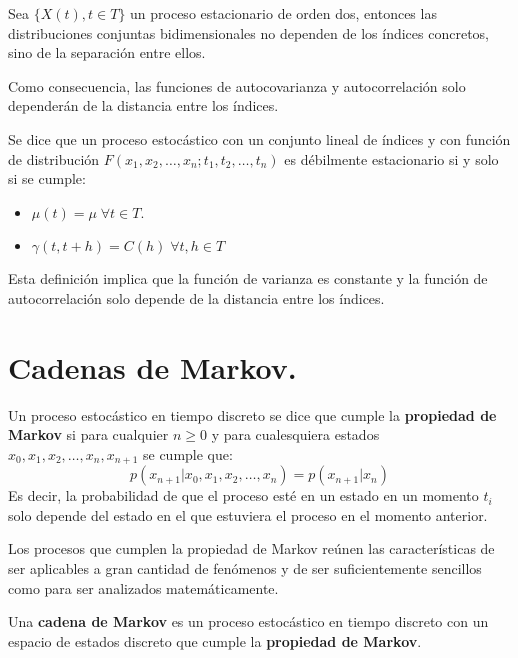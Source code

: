 \begin{teorema}
Sea $\{X(t), t\in T\}$ un proceso estacionario de orden dos, entonces las distribuciones conjuntas bidimensionales no dependen de los \'indices concretos, sino de la separaci\'on entre ellos.
\end{teorema}

Como consecuencia, las funciones de autocovarianza y autocorrelaci\'on solo depender\'an de la distancia entre los \'indices.

\begin{definicion}
Se dice que un proceso estoc\'astico con un conjunto lineal de \'indices y con funci\'on de distribuci\'on $F(x_1,x_2,\ldots,x_n;t_1,t_2,\ldots,t_n)$ es d\'ebilmente estacionario si y solo si se cumple:
\begin{itemize}
\item $\mu(t)=\mu\;\forall t\in T$.
\item $\gamma(t,t+h)=C(h)\;\forall t,h\in T$
\end{itemize}
\end{definicion}

Esta definici\'on implica que la funci\'on de varianza es constante y la funci\'on de autocorrelaci\'on solo depende de la distancia entre los \'indices.

\section{Cadenas de Markov.}

\begin{definicion}
Un proceso estoc\'astico en tiempo discreto se dice que cumple la \textbf{propiedad de Markov} si para cualquier $n\ge 0$ y para cualesquiera estados $x_0,x_1,x_2,\ldots,x_n,x_{n+1}$ se cumple que:
\begin{equation*}
p(x_{n+1}|x_0,x_1,x_2,\ldots,x_n)=p(x_{n+1}|x_n)
\end{equation*}
Es decir, la probabilidad de que el proceso est\'e en un estado en un momento $t_i$ solo depende del estado en el que estuviera el proceso en el momento anterior.
\end{definicion}

Los procesos que cumplen la propiedad de Markov re\'unen las caracter\'isticas de ser aplicables a gran cantidad de fen\'omenos y de ser suficientemente sencillos como para ser analizados matem\'aticamente.

\begin{definicion}
Una \textbf{cadena de Markov} es un proceso estoc\'astico en tiempo discreto con un espacio de estados discreto  que cumple la \textbf{propiedad de Markov}.
\end{definicion}


